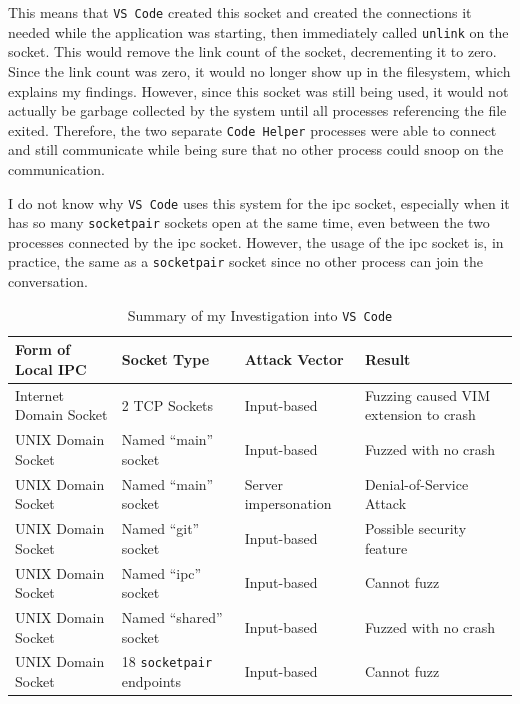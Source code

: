 This means that \texttt{VS Code} created this socket and created the connections it needed while the application was starting, then immediately called \texttt{unlink} on the socket.  This would remove the link count of the socket, decrementing it to zero.  Since the link count was zero, it would no longer show up in the filesystem, which explains my findings.  However, since this socket was still being used, it would not actually be garbage collected by the system until all processes referencing the file exited.  Therefore, the two separate \texttt{Code Helper} processes were able to connect and still communicate while being sure that no other process could snoop on the communication.

I do not know why \texttt{VS Code} uses this system for the ipc socket, especially when it has so many \texttt{socketpair} sockets open at the same time, even between the two processes connected by the ipc socket.  However, the usage of the ipc socket is, in practice, the same as a \texttt{socketpair} socket since no other process can join the conversation.

\begin{table}
\centering
\begin{scriptsize}
\begin{tabular}{ l | l | l | l }
\textbf{Form of Local IPC} & \textbf{Socket Type} & \textbf{Attack Vector} & \textbf{Result} \\ \hline
Internet Domain Socket & 2 TCP Sockets & Input-based & Fuzzing caused VIM extension to crash \\ \hline
UNIX Domain Socket & Named ``main'' socket & Input-based & Fuzzed with no crash \\ \hline
UNIX Domain Socket & Named ``main'' socket & Server impersonation & Denial-of-Service Attack \\ \hline
UNIX Domain Socket & Named ``git'' socket & Input-based & Possible security feature \\ \hline
UNIX Domain Socket & Named ``ipc'' socket & Input-based & Cannot fuzz \\ \hline
UNIX Domain Socket & Named ``shared'' socket & Input-based & Fuzzed with no crash \\ \hline
UNIX Domain Socket & 18 \texttt{socketpair} endpoints & Input-based & Cannot fuzz \\ \hline
\end{tabular}
\caption{Summary of my Investigation into \texttt{VS Code}}
\label{tab:codeData}
\end{scriptsize}
\end{table} 

